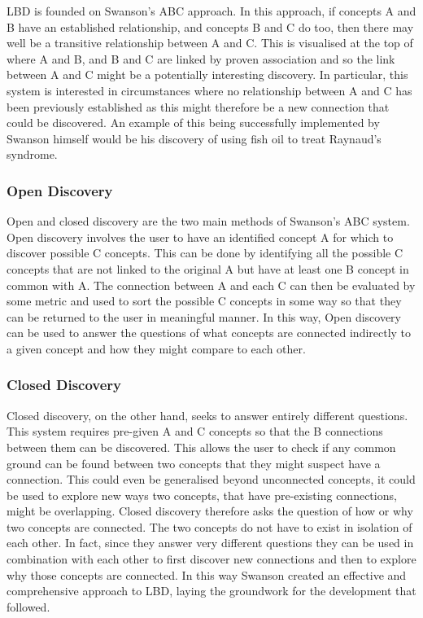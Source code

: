 \documentclass{l4proj}
\begin{document}
LBD is founded on Swanson's ABC approach. In this approach, if concepts A and B have an established relationship, and concepts B and C do too, then there may well be a transitive relationship between A and C. This is visualised at the top of  where A and B, and B and C are linked by proven association and so the link between A and C might be a potentially interesting discovery. In particular, this system is interested in circumstances where no relationship between A and C has been previously established as this might therefore be a new connection that could be discovered. An example of this being successfully implemented by Swanson himself would be his discovery of using fish oil to treat Raynaud's syndrome. \\

\subsubsection{Open Discovery}

Open and closed discovery are the two main methods of Swanson's ABC system. Open discovery involves the user to have an identified concept A for which to discover possible C concepts. This can be done by identifying all the possible C concepts that are not linked to the original A but have at least one B concept in common with A. The connection between A and each C can then be evaluated by some metric and used to sort the possible C concepts in some way so that they can be returned to the user in meaningful manner. In this way, Open discovery can be used to answer the questions of what concepts are connected indirectly to a given concept and how they might compare to each other. \\

\subsubsection{Closed Discovery}

Closed discovery, on the other hand, seeks to answer entirely different questions. This system requires pre-given A and C concepts so that the B connections between them can be discovered. This allows the user to check if any common ground can be found between two concepts that they might suspect have a connection. This could even be generalised beyond unconnected concepts, it could be used to explore new ways two concepts, that have pre-existing connections, might be overlapping. Closed discovery therefore asks the question of how or why two concepts are connected. The two concepts do not have to exist in isolation of each other. In fact, since they answer very different questions they can be used in combination with each other to first discover new connections and then to explore why those concepts are connected. In this way Swanson created an effective and comprehensive approach to LBD, laying the groundwork for the development that followed. \\ 
\end{document}
